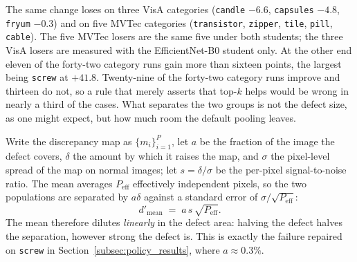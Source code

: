 The same change loses on three VisA categories (\texttt{candle} $-6.6$,
\texttt{capsules} $-4.8$, \texttt{fryum} $-0.3$) and on five MVTec categories
(\texttt{transistor}, \texttt{zipper}, \texttt{tile}, \texttt{pill},
\texttt{cable}). The five MVTec losers are the same five under both students; the
three VisA losers are measured with the EfficientNet-B0 student only. At the other end eleven of the forty-two category runs gain more than
sixteen points, the largest being \texttt{screw} at $+41.8$. Twenty-nine of the
forty-two category runs improve and thirteen do not, so a rule that merely asserts that top-$k$
helps would be wrong in nearly a third of the cases. What separates the two
groups is not the defect size, as one might expect, but how much room the default
pooling leaves.

Write the discrepancy map as $\{m_i\}_{i=1}^{P}$, let $a$ be the fraction of the
image the defect covers, $\delta$ the amount by which it raises the map, and
$\sigma$ the pixel-level spread of the map on normal images; let $s=\delta/\sigma$
be the per-pixel signal-to-noise ratio. The mean averages $P_{\text{eff}}$
effectively independent pixels, so the two populations are separated by $a\delta$
against a standard error of $\sigma/\sqrt{P_{\text{eff}}}$:
\begin{equation}
d'_{\text{mean}} \;=\; a\,s\,\sqrt{P_{\text{eff}}} .
\label{eq:dmean}
\end{equation}
The mean therefore dilutes \emph{linearly} in the defect area: halving the defect
halves the separation, however strong the defect is. This is exactly the failure
repaired on \texttt{screw} in Section~\ref{subsec:policy_results}, where
$a\approx0.3\%$.

